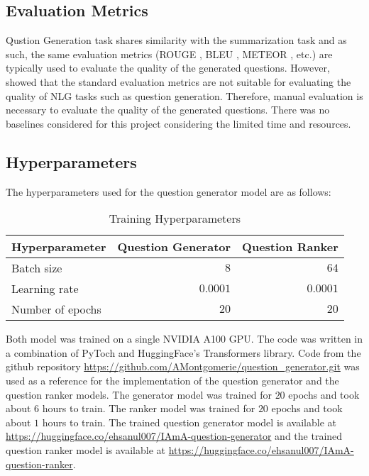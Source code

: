 \documentclass[paper=a4, fontsize=11pt]{scrartcl}
\numberwithin{equation}{section}		%
\numberwithin{figure}{section}			%
\numberwithin{table}{section}				%
\begin{document}
\subsection*{Evaluation Metrics}
Qustion Generation task shares similarity with the summarization task and as such, the same evaluation metrics (ROUGE \cite{lin2004rouge}, BLEU \cite{papineni2002bleu}, METEOR \cite{banerjee2005meteor}, etc.) are typically used to evaluate the quality of the generated questions.
However, \cite{novikova2017we} showed that the standard evaluation metrics are not suitable for evaluating the quality of NLG tasks such as question generation.
Therefore, manual evaluation is necessary to evaluate the quality of the generated questions.
There was no baselines considered for this project considering the limited time and resources.


\subsection*{Hyperparameters}
The hyperparameters used for the question generator model are as follows:

\begin{table}
  \tiny
  \centering
  \begin{tabular}{lrr}
    \hline
    Hyperparameter & Question Generator & Question Ranker \\
    \hline
    Batch size & $8$ & $64$ \\
    Learning rate & $0.0001$ & $0.0001$ \\
    Number of epochs & $20$ & $20$ \\
    \hline
  \end{tabular}
  \caption{Training Hyperparameters}
  \label{tab:hyperparams_qg}
\end{table}

Both model was trained on a single NVIDIA A100 GPU.
The code was written in a combination of PyToch and HuggingFace's Transformers library.
Code from the github repository \url{https://github.com/AMontgomerie/question_generator.git} was used as a reference for the implementation of the question generator and the question ranker models.
The generator model was trained for $20$ epochs and took about $6$ hours to train.
The ranker model was trained for $20$ epochs and took about $1$ hours to train.
The trained question generator model is available at \url{https://huggingface.co/ehsanul007/IAmA-question-generator} and the trained question ranker model is available at \url{https://huggingface.co/ehsanul007/IAmA-question-ranker}.
\end{document}
